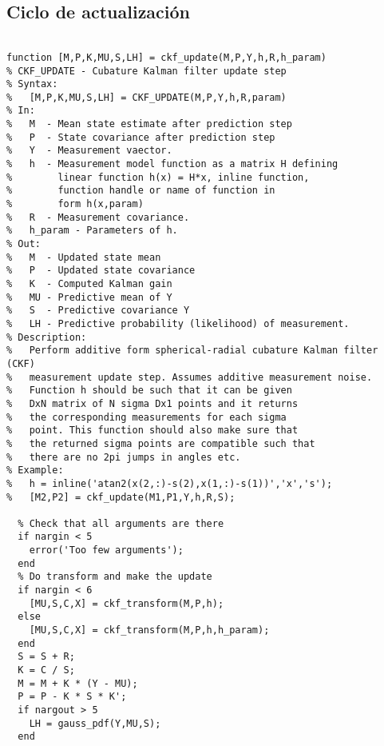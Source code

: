 \subsection{Ciclo de actualización}
\lstset{language=Matlab, breaklines=true, basicstyle=\footnotesize}
\lstset{numbers=left, numberstyle=\tiny, stepnumber=1, numbersep=-2pt}
\begin{lstlisting}[frame=single]

function [M,P,K,MU,S,LH] = ckf_update(M,P,Y,h,R,h_param)
% CKF_UPDATE - Cubature Kalman filter update step
% Syntax:
%   [M,P,K,MU,S,LH] = CKF_UPDATE(M,P,Y,h,R,param)
% In:
%   M  - Mean state estimate after prediction step
%   P  - State covariance after prediction step
%   Y  - Measurement vaector.
%   h  - Measurement model function as a matrix H defining
%        linear function h(x) = H*x, inline function,
%        function handle or name of function in
%        form h(x,param)
%   R  - Measurement covariance.
%   h_param - Parameters of h.
% Out:
%   M  - Updated state mean
%   P  - Updated state covariance
%   K  - Computed Kalman gain
%   MU - Predictive mean of Y
%   S  - Predictive covariance Y
%   LH - Predictive probability (likelihood) of measurement.
% Description:
%   Perform additive form spherical-radial cubature Kalman filter (CKF)
%   measurement update step. Assumes additive measurement noise.
%   Function h should be such that it can be given
%   DxN matrix of N sigma Dx1 points and it returns 
%   the corresponding measurements for each sigma
%   point. This function should also make sure that
%   the returned sigma points are compatible such that
%   there are no 2pi jumps in angles etc.
% Example:
%   h = inline('atan2(x(2,:)-s(2),x(1,:)-s(1))','x','s');
%   [M2,P2] = ckf_update(M1,P1,Y,h,R,S);

  % Check that all arguments are there
  if nargin < 5
    error('Too few arguments');
  end
  % Do transform and make the update
  if nargin < 6
    [MU,S,C,X] = ckf_transform(M,P,h);
  else  
    [MU,S,C,X] = ckf_transform(M,P,h,h_param);
  end
  S = S + R;
  K = C / S;
  M = M + K * (Y - MU);
  P = P - K * S * K';
  if nargout > 5
    LH = gauss_pdf(Y,MU,S);
  end
\end{lstlisting}